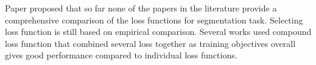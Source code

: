 Paper \cite{ma_segmentation_2020} proposed that so far none of the papers in the literature provide a comprehensive comparison of the loss functions for segmentation task. Selecting loss function is still based on empirical comparison. Several works \cite{} used compound loss function that combined several loss together as training objectives overall gives good performance compared to individual loss functions.

